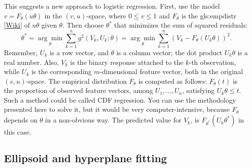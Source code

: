 \documentclass[oneside,10pt]{book}
\begin{document}
This suggests a new approach to logistic regression. First, use the model $v=F_\theta(u\theta)$ in the $(v,u)$-space, where $0\leq v\leq 1$ and 
$F_\theta$ is the
\gls{gls:empdistr}
 [\href{https://en.wikipedia.org/wiki/Empirical_distribution_function}{Wiki}] of $u\theta$ given $\theta$. Then choose $\theta^*$ that minimizes the sum of squared residuals:
$$
\theta^* =\underset{\theta}{\arg\min}\sum_{k=1}^n g^2(V_k,U_k;\theta)=\underset{\theta}{\arg\min}\sum_{k=1}^n (V_k - F_\theta(U_k\theta))^2.
$$
 Remember, $U_k$ is a row vector, and $\theta$ is a column vector; the dot product $U_k\theta$ is a real number. Also,
 $V_k$ is the binary response attached to the $k$-th observation, while $U_k$ is the corresponding $m$-dimensional feature vector, both in the original 
 $(v,u)$-space. The empirical distribution $F_\theta$ is computed as follows: $F_\theta(t)$ is the proportion of observed feature vectors, among $U_1,\dots,U_n$, satisfying  $U_k\theta\leq t$.
Such a method could be called \textcolor{index}{CDF regression}. You can use the methodology presented here to solve it, but it would be very computer-intensive, because $F_\theta$ depends on $\theta$
 in a non-obvious way. The predicted value for $V_k$, is $F_{\theta^*}(U_k\theta^*)$ in this case.
 

\subsection{Ellipsoid and hyperplane fitting}
\end{document}

